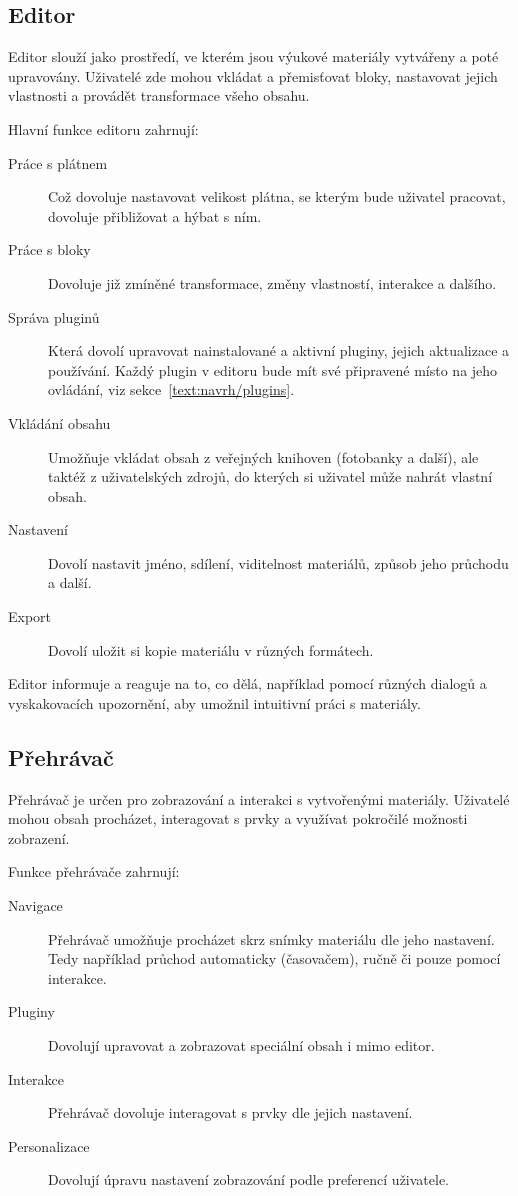 \subsection{Editor}

Editor slouží jako prostředí, ve kterém jsou výukové materiály vytvářeny a poté upravovány. 
Uživatelé zde mohou vkládat a přemisťovat bloky, nastavovat jejich vlastnosti a provádět transformace všeho obsahu.

Hlavní funkce editoru zahrnují:
\begin{description}
    \item[Práce s plátnem] Což dovoluje nastavovat velikost plátna, se kterým bude uživatel pracovat, dovoluje přibližovat a hýbat s ním.
    \item[Práce s bloky] Dovoluje již zmíněné transformace, změny vlastností, interakce a dalšího.
    \item[Správa pluginů] Která dovolí upravovat nainstalované a aktivní pluginy, jejich aktualizace a používání. Každý plugin v editoru bude mít své připravené místo na jeho ovládání, viz sekce~\ref{text:navrh/plugins}.
    \item[Vkládání obsahu] Umožňuje vkládat obsah z veřejných knihoven (fotobanky a další), ale taktéž z uživatelských zdrojů, do kterých si uživatel může nahrát vlastní obsah.
    \item[Nastavení] Dovolí nastavit jméno, sdílení, viditelnost materiálů, způsob jeho průchodu a další.
    \item[Export] Dovolí uložit si kopie materiálu v různých formátech.
\end{description}

Editor informuje a reaguje na to, co dělá, například pomocí různých dialogů a vyskakovacích upozornění, aby umožnil intuitivní práci s materiály.

\subsection{Přehrávač}

Přehrávač je určen pro zobrazování a interakci s vytvořenými materiály. 
Uživatelé mohou obsah procházet, interagovat s prvky a využívat pokročilé možnosti zobrazení.

Funkce přehrávače zahrnují:

\begin{description}
    \item[Navigace] Přehrávač umožňuje procházet skrz snímky materiálu dle jeho nastavení. Tedy například průchod automaticky (časovačem), ručně či pouze pomocí interakce.
    \item[Pluginy] Dovolují upravovat a zobrazovat speciální obsah i mimo editor.
    \item[Interakce] Přehrávač dovoluje interagovat s prvky dle jejich nastavení.
    \item[Personalizace] Dovolují úpravu nastavení zobrazování podle preferencí uživatele.
\end{description}

